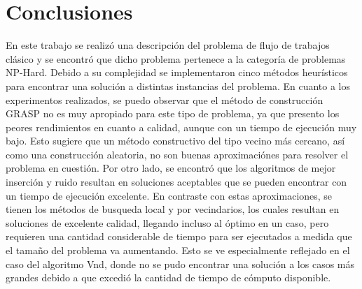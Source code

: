 \documentclass[10pt, twoside]{article}
\begin{document}
\section{Conclusiones}

En este trabajo se realizó una descripción del problema de flujo de trabajos
clásico y se encontró que dicho problema pertenece a la categoría de problemas
NP-Hard. Debido a su complejidad se implementaron cinco métodos heurísticos
para encontrar una solución a distintas instancias del problema. En cuanto a
los experimentos realizados, se puedo observar que el método de construcción
GRASP no es muy apropiado para este tipo de problema, ya que presento los
peores rendimientos en cuanto a calidad, aunque con un tiempo de ejecución muy
bajo.  Esto sugiere que un método constructivo del tipo vecino más cercano, así
como una construcción aleatoria, no son buenas aproximaciónes para resolver el
problema en cuestión.  Por otro lado, se encontró que los algoritmos de mejor
inserción y ruido resultan en soluciones aceptables que se pueden encontrar con
un tiempo de ejecución excelente. En contraste con estas aproximaciones, se
tienen los métodos de busqueda local y por vecindarios, los cuales resultan en
soluciones de excelente calidad, llegando incluso al óptimo en un caso, pero
requieren una cantidad considerable de tiempo para ser ejecutados a medida que
el tamaño del problema va aumentando. Esto se ve especialmente reflejado en el
caso del algoritmo Vnd, donde no se pudo encontrar una solución a los casos más
grandes debido a que excedió la cantidad de tiempo de cómputo disponible.

{\small


}
\end{document}
